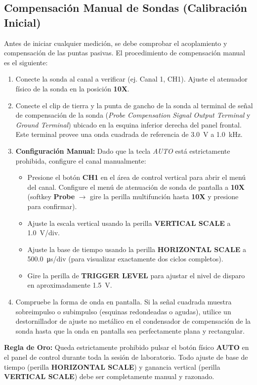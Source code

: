 \documentclass[12pt, letterpaper]{article}
\begin{document}
\subsection{Compensación Manual de Sondas (Calibración Inicial)}
Antes de iniciar cualquier medición, se debe comprobar el acoplamiento y compensación de las puntas pasivas. El procedimiento de compensación manual es el siguiente:
\begin{enumerate}
    \item Conecte la sonda al canal a verificar (ej. Canal 1, CH1). Ajuste el atenuador físico de la sonda en la posición \textbf{10X}.
    \item Conecte el clip de tierra y la punta de gancho de la sonda al terminal de señal de compensación de la sonda (\textit{Probe Compensation Signal Output Terminal} y \textit{Ground Terminal}) ubicado en la esquina inferior derecha del panel frontal. Este terminal provee una onda cuadrada de referencia de \SI{3.0}{\volt} a \SI{1.0}{\kHz}.
    \item \textbf{Configuración Manual:} Dado que la tecla \textit{AUTO} está estrictamente prohibida, configure el canal manualmente:
    \begin{itemize}
        \item Presione el botón \textbf{CH1} en el área de control vertical para abrir el menú del canal. Configure el menú de atenuación de sonda de pantalla a \textbf{10X} (softkey \textbf{Probe} $\rightarrow$ gire la perilla multifunción hasta \textbf{10X} y presione para confirmar).
        \item Ajuste la escala vertical usando la perilla \textbf{VERTICAL SCALE} a \SI{1.0}{V/div}.
        \item Ajuste la base de tiempo usando la perilla \textbf{HORIZONTAL SCALE} a \SI{500.0}{\micro\second/div} (para visualizar exactamente dos ciclos completos).
        \item Gire la perilla de \textbf{TRIGGER LEVEL} para ajustar el nivel de disparo en aproximadamente \SI{1.5}{\volt}.
    \end{itemize}
    \item Compruebe la forma de onda en pantalla. Si la señal cuadrada muestra sobreimpulso o subimpulso (esquinas redondeadas o agudas), utilice un destornillador de ajuste no metálico en el condensador de compensación de la sonda hasta que la onda en pantalla sea perfectamente plana y rectangular.
\end{enumerate}

\textbf{Regla de Oro:} Queda estrictamente prohibido pulsar el botón físico \textbf{AUTO} en el panel de control durante toda la sesión de laboratorio. Todo ajuste de base de tiempo (perilla \textbf{HORIZONTAL SCALE}) y ganancia vertical (perilla \textbf{VERTICAL SCALE}) debe ser completamente manual y razonado.
\end{document}

